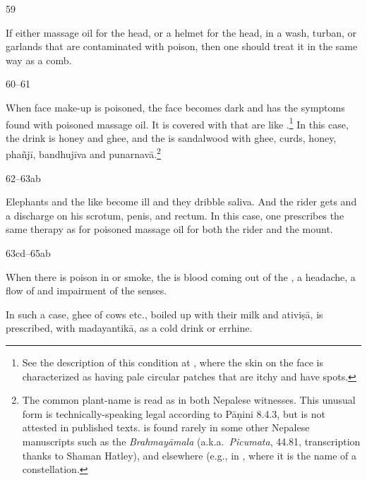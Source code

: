 \begin{translation}
 
 \item[59]
 
 If either massage oil for the head, or a helmet for the head, in a wash, turban, or 
 garlands that are contaminated with poison, then one should treat it in the same 
 way as a comb.
 
 \item[60--61]
 
 When face make-up is poisoned, the face becomes dark and has  the symptoms 
 found
with poisoned massage oil. It is covered with  that are like
.\footnote{See the description of this condition
at , where the skin on the face is characterized as having pale
circular patches that are itchy and have spots.}  In this case, the drink is
honey and ghee, and the  is sandalwood %
with ghee, curds, honey, \gls{phañjī}, %
\gls{bandhujīva} %
and \gls{punarnavā}.\footnote{The common plant-name 
 is
read as  in both Nepalese witnesses.  This unusual form is
technically-speaking legal according to Pāṇini 8.4.3, but is not attested in
published texts.   is found rarely in some other Nepalese
manuscripts such as the \emph{Brahmayāmala} (a.k.a.\ \emph{Picumata}, 44.81,
transcription thanks to Shaman Hatley), and elsewhere (e.g., in
\cite[20]{gana-1920}, where it is the name of a constellation.} %
 
\item[62--63ab] 

Elephants and the like become ill and they dribble saliva. And the rider gets
 and a discharge on his scrotum, penis, and rectum. In this
case, one prescribes the same therapy as for poisoned massage oil for both the
rider and the mount.

\item[63cd--65ab]

When there is poison in  or smoke, the  is
blood coming out of the , a headache, a flow of
 and impairment of the senses.

In such a case, 
ghee of cows etc., boiled up with their milk
and \gls{ativiṣā},
is prescribed, with
\gls{madayantikā},
 as a cold drink or errhine.


\end{translation}
